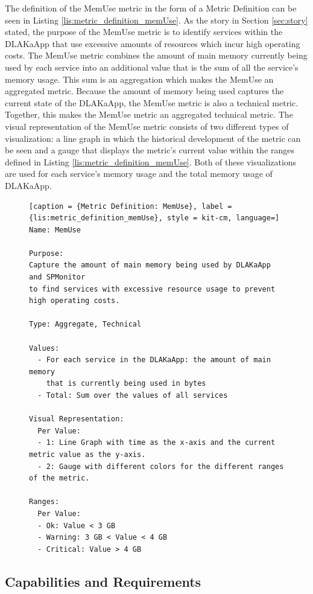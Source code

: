 The definition of the MemUse metric in the form of a
Metric Definition can be seen in Listing \ref{lis:metric_definition_memUse}.
As the story in Section \ref{sec:story} stated, the purpose of the MemUse metric
is to identify services within the DLAKaApp that use excessive amounts of resources
which incur high operating costs.
The MemUse metric combines the amount of main memory currently being used by each service
into an additional value that is the sum of all the service's memory usage. This sum
is an aggregation which makes the MemUse an aggregated metric.
Because the amount of memory being used captures the current state of the DLAKaApp,
the MemUse metric is also a technical metric. Together, this makes the MemUse metric
an aggregated technical metric. The visual representation of the MemUse metric
consists of two different types of visualization: a line graph in which the historical
development of the metric can be seen and a gauge that displays the metric's current value
within the ranges defined in Listing \ref{lis:metric_definition_memUse}.
Both of these visualizations are used for each service's memory usage
and the total memory usage of DLAKaApp.

\begin{figure}[tb]
\begin{lstlisting}[caption = {Metric Definition: MemUse}, label = {lis:metric_definition_memUse}, style = kit-cm, language=]
Name: MemUse

Purpose:
Capture the amount of main memory being used by DLAKaApp and SPMonitor
to find services with excessive resource usage to prevent high operating costs.

Type: Aggregate, Technical

Values:
  - For each service in the DLAKaApp: the amount of main memory
    that is currently being used in bytes
  - Total: Sum over the values of all services

Visual Representation:
  Per Value:
  - 1: Line Graph with time as the x-axis and the current metric value as the y-axis.
  - 2: Gauge with different colors for the different ranges of the metric.

Ranges:
  Per Value:
  - Ok: Value < 3 GB
  - Warning: 3 GB < Value < 4 GB
  - Critical: Value > 4 GB
\end{lstlisting}
\end{figure}

\subsection{Capabilities and Requirements}

